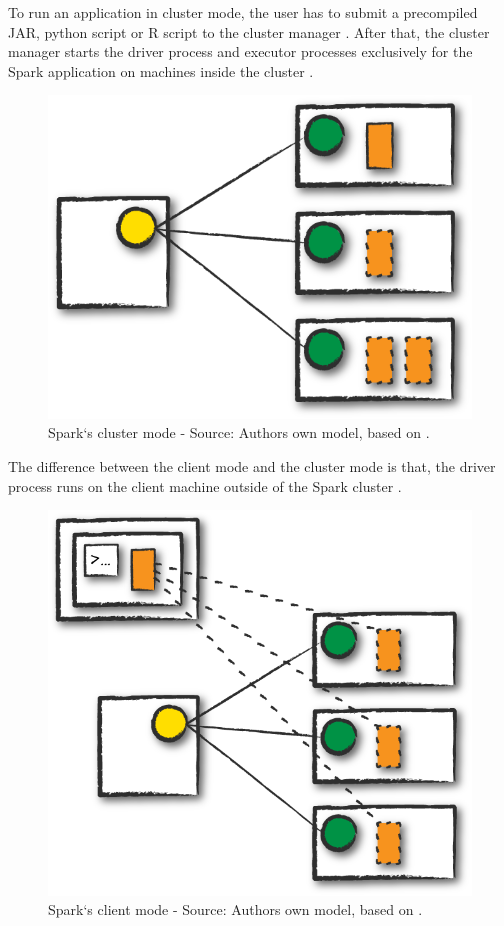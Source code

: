 To run an application in cluster mode, the user has to submit a precompiled JAR, python script or R script to the cluster manager \cite{Chambers2018Spark}. After that, the cluster manager starts the driver process and executor processes exclusively for the Spark application on machines inside the cluster \cite{Chambers2018Spark, Hien2018Spark}.
\begin{figure}[h]%
\centering
\includegraphics[scale=0.5]{images/04_technical_background/cluster_mode}%
\caption{Spark`s cluster mode - Source: Authors own model, based on \cite{Chambers2018Spark}.}%
\label{fig:spark_cluster_mode}%
\end{figure}

The difference between the client mode and the cluster mode is that, the driver process runs on the client machine outside of the Spark cluster \cite{Chambers2018Spark}.
\begin{figure}[h]%
\centering
\includegraphics[scale=0.5]{images/04_technical_background/client_mode}%
\caption{Spark`s client mode - Source: Authors own model, based on \cite{Chambers2018Spark}.}%
\label{fig:spark_client_mode}%
\end{figure}

